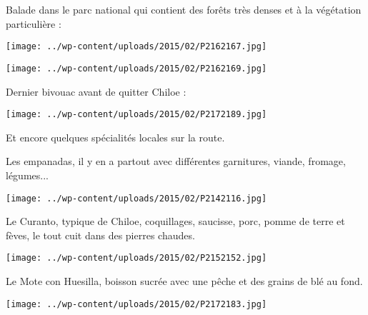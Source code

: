 \pagebreak
 Balade dans le parc national qui contient des forêts très denses et à la végétation particulière :
\begin{center} \texttt{[image: ../wp-content/uploads/2015/02/P2162167.jpg]} \end{center}
\begin{center} \texttt{[image: ../wp-content/uploads/2015/02/P2162169.jpg]} \end{center}
\vspace{-\topsep}
\vspace{-2.75mm}

\pagebreak
  Dernier bivouac avant de quitter Chiloe :
\begin{center} \texttt{[image: ../wp-content/uploads/2015/02/P2172189.jpg]} \end{center}

 Et encore quelques spécialités locales sur la route.

 Les empanadas, il y en a partout avec différentes garnitures, viande, fromage, légumes...
\begin{center} \texttt{[image: ../wp-content/uploads/2015/02/P2142116.jpg]} \end{center}
\vspace{-\topsep}

\pagebreak
 Le Curanto, typique de Chiloe, coquillages, saucisse, porc, pomme de terre et fèves, le tout cuit dans des pierres chaudes.
 \vfill
 \begin{center} \texttt{[image: ../wp-content/uploads/2015/02/P2152152.jpg]} \end{center}

\vfill
 Le Mote con Huesilla, boisson sucrée avec une pêche et des grains de blé au fond.
 \vfill
\begin{center} \texttt{[image: ../wp-content/uploads/2015/02/P2172183.jpg]} \end{center}
\vspace{-\topsep}
\vspace{-0.75mm}